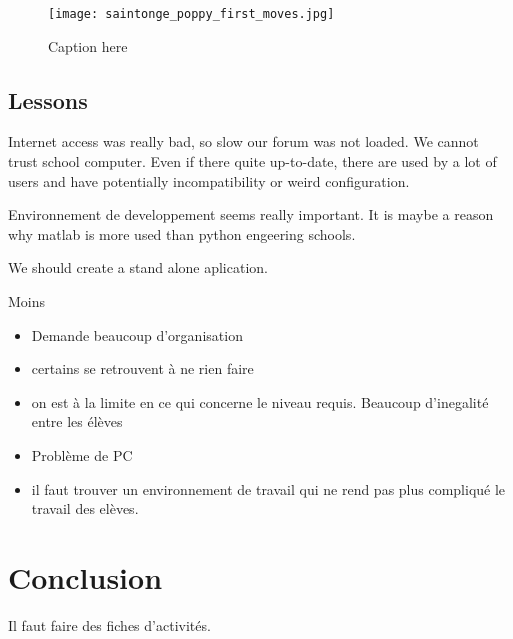 \begin{figure}[]
    \begin{center}
        \texttt{[image: saintonge\_poppy\_first\_moves.jpg]}
    \end{center}
    \caption{Caption here}
    \label{fig:saintonge_result}
\end{figure}

\begin{figure}[]
\centering
    \hfil
    \caption{}
    \label{fig:saintonge_demonstration}
\end{figure}




\subsection{Lessons} %

Internet access was really bad, so slow our forum was not loaded.
We cannot trust school computer. Even if there quite up-to-date, there are used by a lot of users and have potentially incompatibility or weird configuration.


Environnement de developpement seems really important. It is maybe a reason why matlab is more used than python engeering schools.

We should create a stand alone aplication.

Moins

\begin{itemize}
    \item Demande beaucoup d'organisation
    \item certains se retrouvent à ne rien faire
    \item on est à la limite en ce qui concerne le niveau requis. Beaucoup d'inegalité entre les élèves
    \item Problème de PC
    \item il faut trouver un environnement de travail qui ne rend pas plus compliqué le travail des elèves.
\end{itemize}


\section{Conclusion} %

Il faut faire des fiches d'activités.

